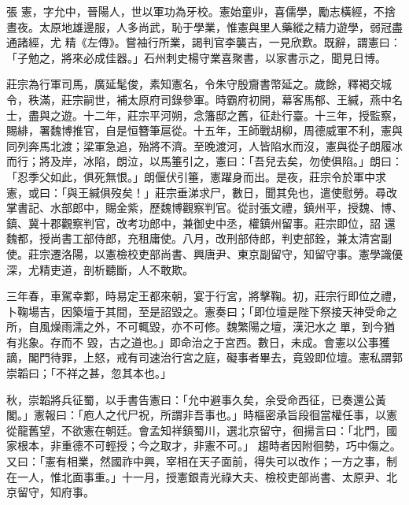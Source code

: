
\begin{pinyinscope}

 張
 憲，字允中，晉陽人，世以軍功為牙校。憲始童丱，喜儒學，勵志橫經，不捨晝夜。太原地雄邊服，人多尚武，恥于學業，惟憲與里人藥縱之精力遊學，弱冠盡通諸經，尤
 精《左傳》。嘗袖行所業，謁判官李襲吉，一見欣歎。既辭，謂憲曰：「子勉之，將來必成佳器。」石州刺史楊守業喜聚書，以家書示之，聞見日博。



 莊宗為行軍司馬，廣延髦俊，素知憲名，令朱守殷齎書幣延之。歲餘，釋褐交城令，秩滿，莊宗嗣世，補太原府司錄參軍。時霸府初開，幕客馬郁、王緘，燕中名士，盡與之遊。十二年，莊宗平河朔，念籓邸之舊，征赴行臺。十三年，授監察，賜緋，署魏博推官，自是恒簪筆扈從。十五年，王師戰胡柳，周德威軍不利，憲與
 同列奔馬北渡；梁軍急追，殆將不濟。至晚渡河，人皆陷水而沒，憲與從子朗履冰而行；將及岸，冰陷，朗泣，以馬箠引之，憲曰：「吾兒去矣，勿使俱陷。」朗曰：「忍季父如此，俱死無恨。」朗偃伏引箠，憲躍身而出。是夜，莊宗令於軍中求憲，或曰：「與王緘俱歿矣！」莊宗垂涕求尸，數日，聞其免也，遣使慰勞。尋改掌書記、水部郎中，賜金紫，歷魏博觀察判官。從討張文禮，鎮州平，授魏、博、鎮、冀十郡觀察判官，改考功郎中，兼御史中丞，權鎮州留事。莊宗即位，詔
 還魏都，授尚書工部侍郎，充租庸使。八月，改刑部侍郎，判吏部銓，兼太清宮副使。莊宗遷洛陽，以憲檢校吏部尚書、興唐尹、東京副留守，知留守事。憲學識優深，尤精吏道，剖析聽斷，人不敢欺。



 三年春，車駕幸鄴，時易定王都來朝，宴于行宮，將擊鞠。初，莊宗行即位之禮，卜鞠場吉，因築壇于其間，至是詔毀之。憲奏曰；「即位壇是陛下祭接天神受命之所，自風燥雨濡之外，不可輒毀，亦不可修。魏繁陽之壇，漢汜水之單，到今猶有兆象。存而不
 毀，古之道也。」即命治之于宮西。數日，未成。會憲以公事獲謫，閣門待罪，上怒，戒有司速治行宮之庭，礙事者畢去，竟毀即位壇。憲私謂郭崇韜曰；「不祥之甚，忽其本也。」



 秋，崇韜將兵征蜀，以手書告憲曰：「允中避事久矣，余受命西征，已奏還公黃閣。」憲報曰：「庖人之代尸祝，所謂非吾事也。」時樞密承旨段徊當權任事，以憲從龍舊望，不欲憲在朝廷。會孟知祥鎮蜀川，選北京留守，徊揚言曰：「北門，國家根本，非重德不可輕授；今之取才，非憲不可。」
 趨時者因附徊勢，巧中傷之。又曰：「憲有相業，然國祚中興，宰相在天子面前，得失可以改作；一方之事，制在一人，惟北面事重。」十一月，授憲銀青光祿大夫、檢校吏部尚書、太原尹、北京留守，知府事。




\end{pinyinscope}
